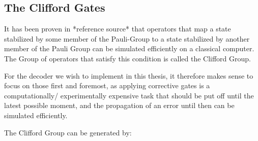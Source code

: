 \subsection{The Clifford Gates}

It has been proven in *reference source* that operators that 
map a state stabilized by some member of the Pauli-Group to 
a state stabilized by another member of the Pauli Group can be simulated efficiently
on a classical computer. The Group of operators that satisfy
this condition is called the Clifford Group.

For the decoder we wish to implement in
this thesis, it therefore makes sense to focus on those first and
foremost, as applying corrective gates is a computationally/
experimentally expensive task that should be put off until the latest
possible moment, and the propagation of an error until then can be
simulated efficiently. 

The Clifford Group can be generated by:

